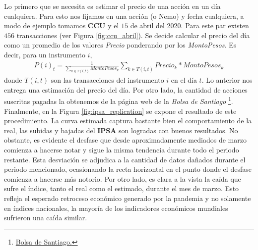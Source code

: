 \documentclass{article}
\begin{document}
   	
   	Lo primero que se necesita es estimar el precio de una acción en un día cualquiera. Para esto nos fijamos en una acción (o Nemo) y fecha cualquiera, a modo de ejemplo tomamos \textbf{CCU} y el $15$ de abril del $2020$. Para este par existen $456$ transacciones (ver Figura \ref{fig:ccu_abril}).   
   	Se decide calcular el precio del día como un promedio de los valores \textit{Precio} ponderando por los \textit{MontoPesos}. Es decir, para un instrumento $i$,
   	\begin{align*}
   		P(i)_t = \frac{1}{\sum_{k\in T(i,t)} MontoPesos_k}\sum_{k\in T(i,t)} Precio_k * MontoPesos_k
   	\end{align*}
 	donde $T(i,t)$ son las transacciones del instrumento $i$ en el día $t$. Lo anterior nos entrega una estimación del precio del día. Por otro lado, la cantidad de acciones suscritas pagadas la obtenemos de la página web de la \textit{Bolsa de Santiago} \footnote{\href{https://www.bolsadesantiago.com/}{Bolsa de Santiago.}}. Finalmente, en la Figura \ref{fig:ipsa_replication} se expone el resultado de este procedimiento.
	La curva estimada captura bastante bien el comportamiento de la real, las subidas y bajadas del \textbf{IPSA} son logradas con buenos resultados. No obstante, es evidente el desfase que desde aproximadamente mediados de marzo comienza a hacerse notar y sigue la misma tendencia durante todo el periodo restante. Esta desviación se adjudica a la cantidad de datos dañados durante el periodo mencionado, ocasionando la recta horizontal en el punto donde el desfase comienza a hacerse más notorio. Por otro lado, es clara a la vista la caída que sufre el índice, tanto el real como el estimado, durante el mes de marzo. Esto refleja el esperado retroceso económico generado por la pandemia y no solamente en índices nacionales, la mayoría de los indicadores económicos mundiales sufrieron una caída similar.
\end{document}
